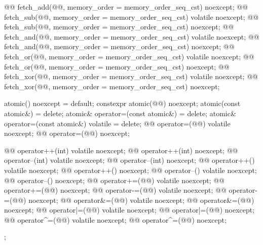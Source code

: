 \begin{codeblock}
{{    @@ fetch_add(@@, memory_order = memory_order_seq_cst) noexcept;
    @@ fetch_sub(@@, memory_order = memory_order_seq_cst) volatile noexcept;
    @@ fetch_sub(@@, memory_order = memory_order_seq_cst) noexcept;
    @@ fetch_and(@@, memory_order = memory_order_seq_cst) volatile noexcept;
    @@ fetch_and(@@, memory_order = memory_order_seq_cst) noexcept;
    @@ fetch_or(@@, memory_order = memory_order_seq_cst) volatile noexcept;
    @@ fetch_or(@@, memory_order = memory_order_seq_cst) noexcept;
    @@ fetch_xor(@@, memory_order = memory_order_seq_cst) volatile noexcept;
    @@ fetch_xor(@@, memory_order = memory_order_seq_cst) noexcept;

    atomic() noexcept = default;
    constexpr atomic(@@) noexcept;
    atomic(const atomic&) = delete;
    atomic& operator=(const atomic&) = delete;
    atomic& operator=(const atomic&) volatile = delete;
    @@ operator=(@@) volatile noexcept;
    @@ operator=(@@) noexcept;

    @@ operator++(int) volatile noexcept;
    @@ operator++(int) noexcept;
    @@ operator--(int) volatile noexcept;
    @@ operator--(int) noexcept;
    @@ operator++() volatile noexcept;
    @@ operator++() noexcept;
    @@ operator--() volatile noexcept;
    @@ operator--() noexcept;
    @@ operator+=(@@) volatile noexcept;
    @@ operator+=(@@) noexcept;
    @@ operator-=(@@) volatile noexcept;
    @@ operator-=(@@) noexcept;
    @@ operator&=(@@) volatile noexcept;
    @@ operator&=(@@) noexcept;
    @@ operator|=(@@) volatile noexcept;
    @@ operator|=(@@) noexcept;
    @@ operator^=(@@) volatile noexcept;
    @@ operator^=(@@) noexcept;
  };
}
\end{codeblock}

